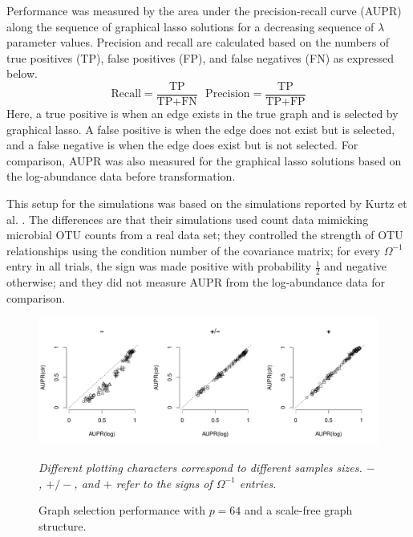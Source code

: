 \documentclass[10pt]{article}
\begin{document}
Performance was measured by the area under the precision-recall curve (AUPR) along the sequence of graphical lasso solutions for a decreasing sequence of $\lambda$ parameter values. Precision and recall are calculated based on the numbers of true positives (TP), false positives (FP), and false negatives (FN) as expressed below.
\begin{equation}
\text{Recall} = \frac{\text{TP}}{\text{TP}+\text{FN}}\ \ \ \text{Precision} = \frac{\text{TP}}{\text{TP}+\text{FP}}
\end{equation}
Here, a true positive is when an edge exists in the true graph and is selected by graphical lasso. A false positive is when the edge does not exist but is selected, and a false negative is when the edge does exist but is not selected. For comparison, AUPR was also measured for the graphical lasso solutions based on the log-abundance data before transformation.

This setup for the simulations was based on the simulations reported by Kurtz et al. \citeyear{kurtz}. The differences are that their simulations used count data mimicking microbial OTU counts from a real data set; they controlled the strength of OTU relationships using the condition number of the covariance matrix; for every $\Omega^{-1}$ entry in all trials, the sign was made positive with probability $\frac{1}{2}$ and negative otherwise; and they did not measure AUPR from the log-abundance data for comparison.

\begin{figure}
\caption{Graph selection performance with $p = 64$ and a scale-free graph structure.}
\label{f:perf64}
\begin{center}
\includegraphics[width=6.5in]{figs/sim-64-scalefree.pdf}
\begin{small}
\textit{Different plotting characters correspond to different samples sizes. $-$, $+/-$, and $+$ refer to the signs of $\Omega^{-1}$ entries.}
\end{small}
\end{center}
\end{figure}
\end{document}
